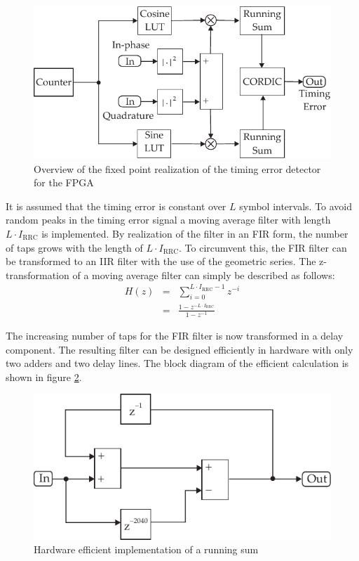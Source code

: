 \begin{figure}[htb]
	\centering
		\includegraphics[]{../kapitel04/figures/sff_ted.pdf}
	\caption{Overview of the fixed point realization of the timing error detector for the FPGA}
	\label{fig:sff_ted}
\end{figure}

It is assumed that the timing error is constant over $L$ symbol intervals. To avoid random peaks in the timing error signal a moving average filter with length $L \cdot I_\text{RRC}$ is implemented. By realization of the filter in an FIR form, the number of taps grows with the length of $L\cdot I_\text{RRC}$. To circumvent this, the FIR filter can be transformed to an IIR filter with the use of the geometric series. The z-transformation of a moving average filter can simply be described as follows:
\begin{eqnarray}
H(z) 	&=& \sum_{i=0}^{L\cdot I_\text{RRC}-1}{z^{-i}} \\
			&=& \frac{1-z^{-L\cdot I_\text{RRC}}}{1-z^{-1}}
\end{eqnarray}

The increasing number of taps for the FIR filter is now transformed in a delay component. The resulting filter can be designed efficiently in hardware with only two adders and two delay lines. The block diagram of the efficient calculation is shown in figure \ref{fig:sff_rs}.

\begin{figure}[htb]
	\centering
		\includegraphics[]{../kapitel04/figures/sff_running_sum.pdf}
	\caption{Hardware efficient implementation of a running sum}
	\label{fig:sff_rs}
\end{figure}

